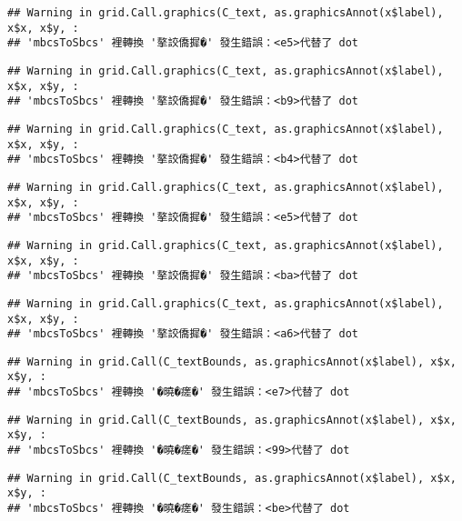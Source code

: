 \documentclass[
]{article}
\begin{document}
\begin{verbatim}
## Warning in grid.Call.graphics(C_text, as.graphicsAnnot(x$label), x$x, x$y, :
## 'mbcsToSbcs' 裡轉換 '摮詨僑摨�' 發生錯誤：<e5>代替了 dot
\end{verbatim}

\begin{verbatim}
## Warning in grid.Call.graphics(C_text, as.graphicsAnnot(x$label), x$x, x$y, :
## 'mbcsToSbcs' 裡轉換 '摮詨僑摨�' 發生錯誤：<b9>代替了 dot
\end{verbatim}

\begin{verbatim}
## Warning in grid.Call.graphics(C_text, as.graphicsAnnot(x$label), x$x, x$y, :
## 'mbcsToSbcs' 裡轉換 '摮詨僑摨�' 發生錯誤：<b4>代替了 dot
\end{verbatim}

\begin{verbatim}
## Warning in grid.Call.graphics(C_text, as.graphicsAnnot(x$label), x$x, x$y, :
## 'mbcsToSbcs' 裡轉換 '摮詨僑摨�' 發生錯誤：<e5>代替了 dot
\end{verbatim}

\begin{verbatim}
## Warning in grid.Call.graphics(C_text, as.graphicsAnnot(x$label), x$x, x$y, :
## 'mbcsToSbcs' 裡轉換 '摮詨僑摨�' 發生錯誤：<ba>代替了 dot
\end{verbatim}

\begin{verbatim}
## Warning in grid.Call.graphics(C_text, as.graphicsAnnot(x$label), x$x, x$y, :
## 'mbcsToSbcs' 裡轉換 '摮詨僑摨�' 發生錯誤：<a6>代替了 dot
\end{verbatim}

\begin{verbatim}
## Warning in grid.Call(C_textBounds, as.graphicsAnnot(x$label), x$x, x$y, :
## 'mbcsToSbcs' 裡轉換 '�曉�瘥�' 發生錯誤：<e7>代替了 dot
\end{verbatim}

\begin{verbatim}
## Warning in grid.Call(C_textBounds, as.graphicsAnnot(x$label), x$x, x$y, :
## 'mbcsToSbcs' 裡轉換 '�曉�瘥�' 發生錯誤：<99>代替了 dot
\end{verbatim}

\begin{verbatim}
## Warning in grid.Call(C_textBounds, as.graphicsAnnot(x$label), x$x, x$y, :
## 'mbcsToSbcs' 裡轉換 '�曉�瘥�' 發生錯誤：<be>代替了 dot
\end{verbatim}
\end{document}
